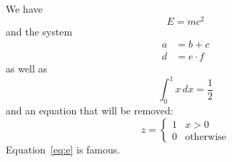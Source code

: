 \documentclass{article}
\begin{document}
We have
\begin{equation}
  E = mc^2 \label{eq:e}
\end{equation}
and the system
\begin{align}
  a &= b + c \\
  d &= e \cdot f \label{eq:d}
\end{align}
as well as
\[ \int_0^1 x\,dx = \frac{1}{2} \]
and an equation that will be removed:
\begin{equation*}
  z = \begin{cases} 1 & x > 0 \\ 0 & \text{otherwise} \end{cases}
\end{equation*}
Equation~\eqref{eq:e} is famous.
\end{document}
